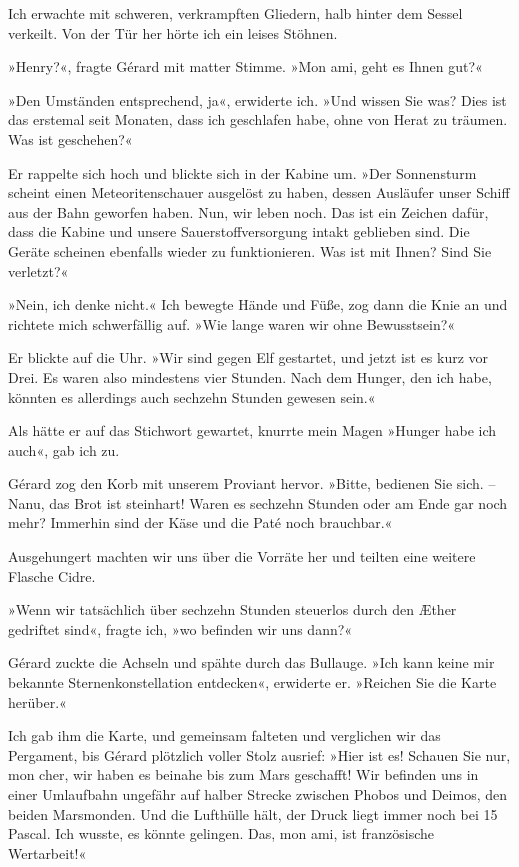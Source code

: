 Ich erwachte mit schweren, verkrampften Gliedern, halb hinter dem
Sessel verkeilt. Von der Tür her hörte ich ein leises Stöhnen.

»Henry?«, fragte Gérard mit matter Stimme. »Mon ami, geht es Ihnen
gut?«

»Den Umständen entsprechend, ja«, erwiderte ich. »Und wissen Sie
was? Dies ist das erstemal seit Monaten, dass ich geschlafen habe,
ohne von Herat zu träumen. Was ist geschehen?«

Er rappelte sich hoch und blickte sich in der Kabine um. »Der
Sonnensturm scheint einen Meteoritenschauer ausgelöst zu haben,
dessen Ausläufer unser Schiff aus der Bahn geworfen haben. Nun, wir
leben noch. Das ist ein Zeichen dafür, dass die Kabine und unsere
Sauerstoffversorgung intakt geblieben sind. Die Geräte scheinen
ebenfalls wieder zu funktionieren. Was ist mit Ihnen? Sind Sie
verletzt?«

»Nein, ich denke nicht.« Ich bewegte Hände und Füße, zog dann die
Knie an und richtete mich schwerfällig auf. »Wie lange waren wir
ohne Bewusstsein?«

Er blickte auf die Uhr. »Wir sind gegen Elf gestartet, und jetzt
ist es kurz vor Drei. Es waren also mindestens vier Stunden. Nach
dem Hunger, den ich habe, könnten es allerdings auch sechzehn
Stunden gewesen sein.«

Als hätte er auf das Stichwort gewartet, knurrte mein Magen »Hunger
habe ich auch«, gab ich zu.

Gérard zog den Korb mit unserem Proviant hervor. »Bitte, bedienen
Sie sich. – Nanu, das Brot ist steinhart! Waren es sechzehn Stunden
oder am Ende gar noch mehr? Immerhin sind der Käse und die Paté
noch brauchbar.«

Ausgehungert machten wir uns über die Vorräte her und teilten eine
weitere Flasche Cidre.

»Wenn wir tatsächlich über sechzehn Stunden steuerlos durch den
Æther gedriftet sind«, fragte ich, »wo befinden wir uns dann?«

Gérard zuckte die Achseln und spähte durch das Bullauge. »Ich kann
keine mir bekannte Sternenkonstellation entdecken«, erwiderte er.
»Reichen Sie die Karte herüber.«

Ich gab ihm die Karte, und gemeinsam falteten und verglichen wir
das Pergament, bis Gérard plötzlich voller Stolz ausrief: »Hier ist
es! Schauen Sie nur, mon cher, wir haben es beinahe bis zum Mars
geschafft! Wir befinden uns in einer Umlaufbahn ungefähr auf halber
Strecke zwischen Phobos und Deimos, den beiden Marsmonden. Und die
Lufthülle hält, der Druck liegt immer noch bei 15 Pascal. Ich
wusste, es könnte gelingen. Das, mon ami, ist französische
Wertarbeit!«

